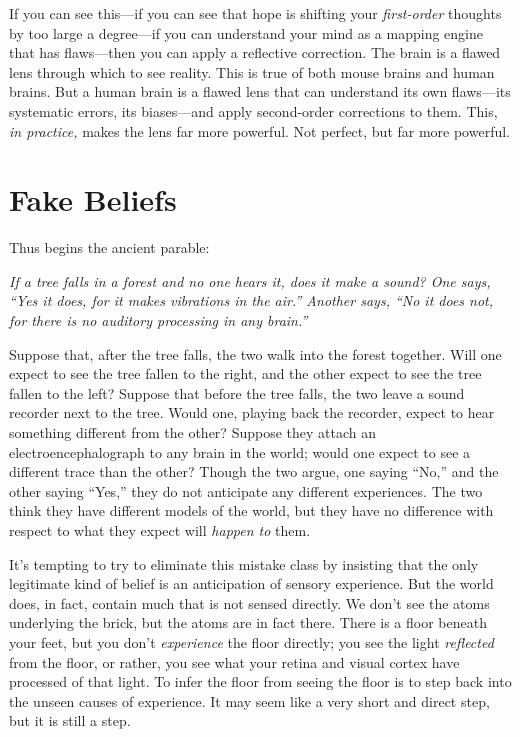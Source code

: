 {
 If you can see this---if you can see that hope is shifting your
\textit{first-order} thoughts by too large a degree---if you can
understand your mind as a mapping engine that has flaws---then you can
apply a reflective correction. The brain is a flawed lens through which
to see reality. This is true of both mouse brains and human brains. But
a human brain is a flawed lens that can understand its own flaws---its
systematic errors, its biases---and apply second-order corrections to
them. This, \textit{in practice,} makes the lens far more powerful. Not
perfect, but far more powerful.}

\myendsectiontext


\bigskip


\chapter{Fake Beliefs}

\label{making_beliefs_pay_rent}

{
 Thus begins the ancient parable: }

{
 \textit{If a tree falls in a forest and no one hears it, does it
make a sound? One says, ``Yes it does, for it makes
vibrations in the air.'' Another says,
``No it does not, for there is no auditory processing
in any brain.''}}

{
 Suppose that, after the tree falls, the two walk into the forest
together. Will one expect to see the tree fallen to the right, and the
other expect to see the tree fallen to the left? Suppose that before
the tree falls, the two leave a sound recorder next to the tree. Would
one, playing back the recorder, expect to hear something different from
the other? Suppose they attach an electroencephalograph to any brain in
the world; would one expect to see a different trace than the other?
Though the two argue, one saying
``No,'' and the other saying
``Yes,'' they do not anticipate any
different experiences. The two think they have different models of the
world, but they have no difference with respect to what they expect
will \textit{happen to} them.}

{
 It's tempting to try to eliminate this mistake
class by insisting that the only legitimate kind of belief is an
anticipation of sensory experience. But the world does, in fact,
contain much that is not sensed directly. We don't see
the atoms underlying the brick, but the atoms are in fact there. There
is a floor beneath your feet, but you don't
\textit{experience} the floor directly; you see the light
\textit{reflected} from the floor, or rather, you see what your retina
and visual cortex have processed of that light. To infer the floor from
seeing the floor is to step back into the unseen causes of experience.
It may seem like a very short and direct step, but it is still a step.}

